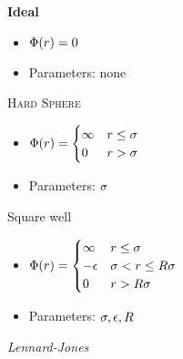 \begin{mdframed}


	\vspace*{\baselineskip}
    
    \indent

	\textbf{Ideal}
    
    \begin{itemize}[label={--}]
	
    \item $\pot(\pos) = 0 $ 
    
    \item Parameters: none
    
    \end{itemize}
    
	\textsc{Hard Sphere}

	\begin{itemize}[label={--}]
	
    \item $\pot(\pos)=\begin{cases}
                    \infty &\pos \leq \molecrad\\
                    0 &\pos > \molecrad\\
                \end{cases}$
	
    \item Parameters: $\molecrad$   

	\end{itemize}
   
	\textsf{Square well}

	\begin{itemize}[label=]
	
    \item $\pot(\pos)=\begin{cases}
             \infty &\pos \leq \molecrad\\
             -\dielec &\molecrad < \pos \leq R\molecrad\\
                    0 & \pos > R\molecrad
                \end{cases}$
	
    \item Parameters: $\molecrad, \dielec, R$

	\end{itemize}

    \textit{Lennard-Jones}
    
    \begin{itemize}[label=]
	

\end{itemize}
\end{mdframed}
